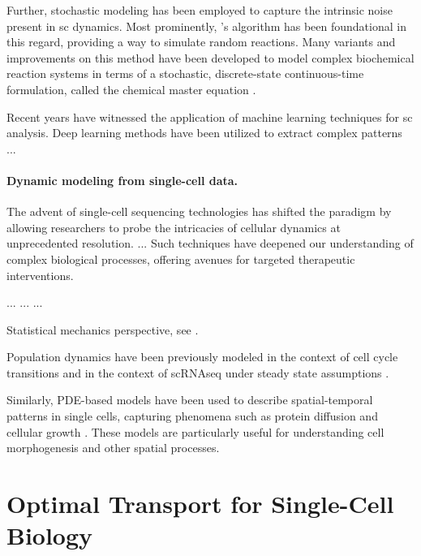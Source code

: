 Further, stochastic modeling has been employed to capture the intrinsic noise present in \acrlong{sc} dynamics. Most prominently, \citeauthor{gillespie1977exact}'s algorithm \citep{gillespie1977exact} has been foundational in this regard, providing a way to simulate random reactions. Many variants and improvements on this method have been developed to model complex biochemical reaction systems \citep{gibson2000efficient} in terms of a stochastic, discrete-state continuous-time formulation, called the chemical master equation \citep{liang2010computational}.

Recent years have witnessed the application of machine learning techniques for \acrlong{sc} analysis. Deep learning methods have been utilized to extract complex patterns ...

\paragraph{Dynamic modeling from single-cell data.}

The advent of single-cell sequencing technologies has shifted the paradigm by allowing researchers to probe the intricacies of cellular dynamics at unprecedented resolution. ... Such techniques have deepened our understanding of complex biological processes, offering avenues for targeted therapeutic interventions.

\citep{fischer2019inferring} ...
\citep{hashimoto2016learning} ...
\citep{chen2022deepvelo} ...

Statistical mechanics perspective, see \citet{teschendorff2021statistical}.

Population dynamics have been previously modeled in the context of cell cycle transitions \citep{kafri2013dynamics, kuritz2017relationship} and in the context of \acrshort{sc}\acrshort{RNAseq} under steady state assumptions \citep{weinreb2018fundamental}.

Similarly, PDE-based models have been used to describe spatial-temporal patterns in single cells, capturing phenomena such as protein diffusion and cellular growth \citep{turing1990chemical, erban2004individual}. These models are particularly useful for understanding cell morphogenesis and other spatial processes.


\section{Optimal Transport for Single-Cell Biology}
\label{sec:ot_for_biology}

